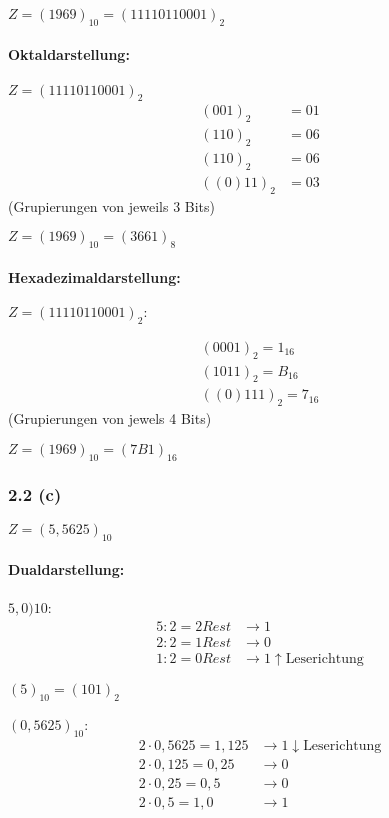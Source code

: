 \documentclass[11pt,a4paper]{article}
\begin{document}
$Z = (1969)_{10} =  (11110110001)_2$

\paragraph{Oktaldarstellung:}
$Z = (11110110001)_2$
\begin{align*}
(001)_2 &= 01\\
(110)_2 &= 06\\
(110)_2 &= 06\\
((0)11)_2 &= 03
\end{align*}
(Grupierungen von jeweils 3 Bits)

$Z = (1969)_{10} = (3661)_{8}$

\paragraph{Hexadezimaldarstellung:}
$Z = (11110110001)_2:$

\begin{align*}
(0001)_2 = 1_{16}\\
(1011)_2 = B_{16}\\
((0)111)_2= 7_{16}
\end{align*}
(Grupierungen von jewels 4 Bits)

$Z = (1969)_{10} = (7B1)_{16}$

\subsubsection{2.2 (c)}
$Z = (5,5625)_{10}$

\paragraph{Dualdarstellung:}
$5,0)10$:
\begin{align*}
5 : 2 = 2 Rest &\rightarrow 1\\
2 : 2 = 1 Rest &\rightarrow 0\\
1 : 2 = 0 Rest &\rightarrow 1 \uparrow \mbox{Leserichtung}
\end{align*}

$(5)_{10} = (101)_2$

$(0,5625)_{10}$:
\begin{align*}
2 \cdot 0,5625 = 1,125 &\rightarrow 1 \downarrow \mbox{Leserichtung}\\
2 \cdot 0,125 = 0,25 &\rightarrow 0\\
2 \cdot 0,25 = 0,5 &\rightarrow 0\\
2 \cdot 0,5 = 1,0 &\rightarrow 1
\end{align*}
\end{document}
